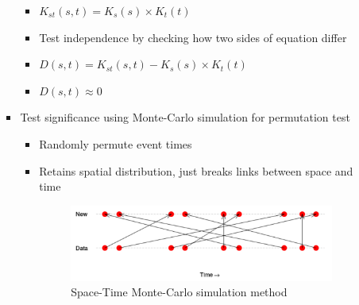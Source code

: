 \documentclass{article}
\begin{document}
\begin{itemize}
\begin{itemize}
\begin{itemize}
            \begin{itemize}
                \item $K_{st}(s, t) = K_s(s) \times K_t(t)$
                \item Test independence by checking how two sides of equation differ
                \item $D(s, t) = K_{st}(s, t) - K_s(s) \times K_t(t)$
                \item $D(s, t) \approx 0$
            \end{itemize}
            \item Test significance using Monte-Carlo simulation for permutation test
            \begin{itemize}
                \item Randomly permute event times
                \item Retains spatial distribution, just breaks links between space and time
                
                \begin{figure}[h]
                    \centering
                    \caption{Space-Time Monte-Carlo simulation method}
                    \label{space time mc}
                    \includegraphics[width=10cm]{space-time-mc.png}
                \end{figure}


\end{itemize}
\end{itemize}
\end{itemize}
\end{itemize}
\end{document}
